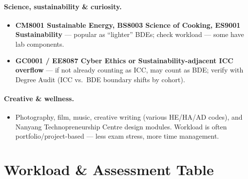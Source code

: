 \paragraph{Science, sustainability \& curiosity.}
\begin{itemize}
    \item \textbf{CM8001 Sustainable Energy, BS8003 Science of Cooking, ES9001 Sustainability} --- popular as ``lighter'' BDEs; check workload --- some have lab components.
    \item \textbf{GC0001 / EE8087 Cyber Ethics or Sustainability-adjacent ICC overflow} --- if not already counting as ICC, may count as BDE; verify with Degree Audit (ICC vs.\ BDE boundary shifts by cohort).
\end{itemize}

\paragraph{Creative \& wellness.}
\begin{itemize}
    \item Photography, film, music, creative writing (various HE/HA/AD codes), and Nanyang Technopreneurship Centre design modules. Workload is often portfolio/project-based --- less exam stress, more time management.
\end{itemize}

\section{Workload \& Assessment Table}
\label{sec:workload-table}

